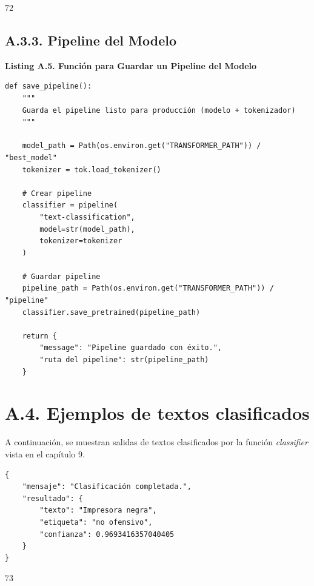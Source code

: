 \begin{center}
72
\end{center}

\newpage


\subsection*{A.3.3. Pipeline del Modelo}

\begin{center}
\textbf{Listing A.5. Función para Guardar un Pipeline del Modelo}
\end{center}

\begin{lstlisting}[style=pythoncode]
def save_pipeline():
    """
    Guarda el pipeline listo para producción (modelo + tokenizador)
    """

    model_path = Path(os.environ.get("TRANSFORMER_PATH")) / "best_model"
    tokenizer = tok.load_tokenizer()

    # Crear pipeline
    classifier = pipeline(
        "text-classification",
        model=str(model_path),
        tokenizer=tokenizer
    )

    # Guardar pipeline
    pipeline_path = Path(os.environ.get("TRANSFORMER_PATH")) / "pipeline"
    classifier.save_pretrained(pipeline_path)

    return {
        "message": "Pipeline guardado con éxito.",
        "ruta del pipeline": str(pipeline_path)
    }
\end{lstlisting}

\section*{A.4. Ejemplos de textos clasificados}

A continuación, se muestran salidas de textos clasificados por la función \textit{classifier} vista en el capítulo 9.

\begin{lstlisting}[style=jsoncode]
{
    "mensaje": "Clasificación completada.",
    "resultado": {
        "texto": "Impresora negra",
        "etiqueta": "no ofensivo",
        "confianza": 0.9693416357040405
    }
}
\end{lstlisting}

\begin{center}
73
\end{center}

